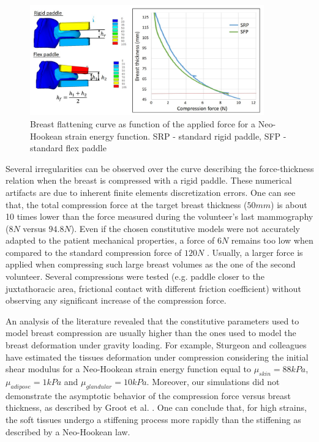 \begin{figure}[!h]
\centering
\includegraphics[width=0.9\textwidth,keepaspectratio]{figures/compressionforceNH.jpg} 
\caption{Breast flattening curve as function of the applied force for a Neo-Hookean strain energy function. SRP - standard rigid paddle, SFP -standard flex paddle}\label{fig:thicknessforcerelationNH}
\end{figure}

Several irregularities can be observed over the curve  describing the force-thickness relation when the breast is compressed with a rigid paddle. These numerical artifacts are due to inherent finite elements discretization errors.  One can see that, the total compression force at the target breast thickness ($50mm$) is about 10 times lower than the force measured during the volunteer's last mammography ($8N$ versus $94.8N$). Even if the chosen constitutive models were not accurately adapted to the patient mechanical properties, a force of $6N$ remains too low when compared to the standard compression force of $120N$ \citep{chida_reduced_2009}. Usually, a larger force is applied when compressing such large breast volumes as the one of the second volunteer.  Several compressions were tested (e.g. paddle closer to the juxtathoracic area, frictional contact with different friction coefficient) without observing any significant increase of the compression force. 

An analysis of the literature revealed that the constitutive parameters used to model breast compression are usually higher than the ones used to model the breast deformation under gravity loading. For example, Sturgeon and colleagues \citep{sturgeon_finite_element_2016} have estimated the tissues deformation under compression considering the initial shear modulus for a Neo-Hookean strain energy function equal to $\mu_{skin} = 88kPa$, $\mu_{adipose} = 1kPa$ and $\mu_{glandular}= 10kPa$. Moreover, our simulations did not demonstrate the asymptotic behavior of the compression force versus breast thickness, as described by Groot et al. \citep{de_pain_2015}.  One can conclude that, for high strains, the soft tissues undergo a stiffening process more rapidly than the stiffening as described by a Neo-Hookean law.

